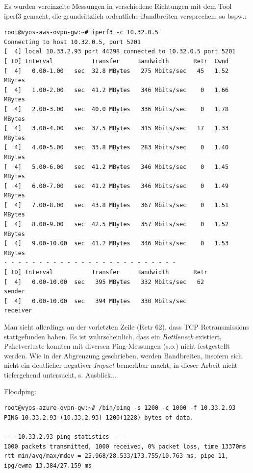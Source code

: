 Es wurden vereinzelte Messungen in verschiedene Richtungen mit dem Tool \textsf{iperf3} gemacht, die grundsätzlich \glqq ordentliche\grqq{} Bandbreiten versprechen, so bspw.:

\begin{verbatim}
root@vyos-aws-ovpn-gw:~# iperf3 -c 10.32.0.5
Connecting to host 10.32.0.5, port 5201
[  4] local 10.33.2.93 port 44298 connected to 10.32.0.5 port 5201
[ ID] Interval           Transfer     Bandwidth       Retr  Cwnd
[  4]   0.00-1.00   sec  32.8 MBytes   275 Mbits/sec   45   1.52 MBytes
[  4]   1.00-2.00   sec  41.2 MBytes   346 Mbits/sec    0   1.66 MBytes
[  4]   2.00-3.00   sec  40.0 MBytes   336 Mbits/sec    0   1.78 MBytes
[  4]   3.00-4.00   sec  37.5 MBytes   315 Mbits/sec   17   1.33 MBytes
[  4]   4.00-5.00   sec  33.8 MBytes   283 Mbits/sec    0   1.40 MBytes
[  4]   5.00-6.00   sec  41.2 MBytes   346 Mbits/sec    0   1.45 MBytes
[  4]   6.00-7.00   sec  41.2 MBytes   346 Mbits/sec    0   1.49 MBytes
[  4]   7.00-8.00   sec  43.8 MBytes   367 Mbits/sec    0   1.51 MBytes
[  4]   8.00-9.00   sec  42.5 MBytes   357 Mbits/sec    0   1.52 MBytes
[  4]   9.00-10.00  sec  41.2 MBytes   346 Mbits/sec    0   1.53 MBytes
- - - - - - - - - - - - - - - - - - - - - - - - -
[ ID] Interval           Transfer     Bandwidth       Retr
[  4]   0.00-10.00  sec   395 MBytes   332 Mbits/sec   62             sender
[  4]   0.00-10.00  sec   394 MBytes   330 Mbits/sec                  receiver
\end{verbatim}

Man sieht allerdings an der vorletzten Zeile (\glqq Retr 62\grqq{}), dass TCP Retransmissions stattgefunden haben. Es ist wahrscheinlich, dass ein \textit{Bottleneck} existiert, Paketverluste konnten mit diversen Ping-Messungen (s.o.) nicht festgestellt werden. Wie in der Abgrenzung geschrieben, werden Bandbreiten, insofern sich nicht ein deutlicher negativer \textit{Impact} bemerkbar macht, in dieser Arbeit nicht tiefergehend untersucht, s. Ausblick...

Floodping:
\begin{verbatim}
root@vyos-azure-ovpn-gw:~# /bin/ping -s 1200 -c 1000 -f 10.33.2.93
PING 10.33.2.93 (10.33.2.93) 1200(1228) bytes of data.

--- 10.33.2.93 ping statistics ---
1000 packets transmitted, 1000 received, 0% packet loss, time 13370ms
rtt min/avg/max/mdev = 25.968/28.533/173.755/10.763 ms, pipe 11, ipg/ewma 13.384/27.159 ms
\end{verbatim}
\fi


